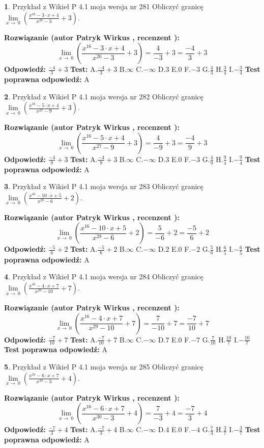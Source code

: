 \documentclass[12pt, a4paper]{article}
\theoremstyle{definition} %
\newtheorem{zad}{}
\newcommand{\zadStart}[1]{\begin{zad}#1\newline}
\newcommand{\zadStop}{\end{zad}}
\newcommand{\rozwStart}[2]{\noindent \textbf{Rozwiązanie (autor #1 , recenzent #2): }\newline}
\newcommand{\rozwStop}{\newline}
\newcommand{\odpStart}{\noindent \textbf{Odpowiedź:}\newline}
\newcommand{\odpStop}{\newline}
\newcommand{\testStart}{\noindent \textbf{Test:}\newline}
\newcommand{\testStop}{\newline}
\newcommand{\kluczStart}{\noindent \textbf{Test poprawna odpowiedź:}\newline}
\newcommand{\kluczStop}{\newline}
\begin{document}
\zadStart{Przykład z Wikieł P 4.1 moja wersja nr 281}
Obliczyć granicę $\lim\limits_{x\to\ 0}(\frac{x^{16}-3 \cdot x +4}{x^{26}-3}+3)$.
\zadStop
\rozwStart{Patryk Wirkus}{}
$$\lim\limits_{x\to\ 0}(\frac{x^{16}-3 \cdot x +4}{x^{26}-3}+3)=\frac{4}{-3}+3=\frac{-4}{3}+3$$
\rozwStop
\odpStart
$\frac{-4}{3}+3$
\odpStop
\testStart
A.$\frac{-4}{3}+3$
B.$\infty$
C.$-\infty$
D.$3$
E.$0$
F.$-3$
G.$\frac{4}{3}$
H.$\frac{3}{4}$
I.$-\frac{3}{4}$
\testStop
\kluczStart
A
\kluczStop



\zadStart{Przykład z Wikieł P 4.1 moja wersja nr 282}
Obliczyć granicę $\lim\limits_{x\to\ 0}(\frac{x^{16}-5 \cdot x +4}{x^{27}-9}+3)$.
\zadStop
\rozwStart{Patryk Wirkus}{}
$$\lim\limits_{x\to\ 0}(\frac{x^{16}-5 \cdot x +4}{x^{27}-9}+3)=\frac{4}{-9}+3=\frac{-4}{9}+3$$
\rozwStop
\odpStart
$\frac{-4}{9}+3$
\odpStop
\testStart
A.$\frac{-4}{9}+3$
B.$\infty$
C.$-\infty$
D.$3$
E.$0$
F.$-3$
G.$\frac{4}{9}$
H.$\frac{9}{4}$
I.$-\frac{9}{4}$
\testStop
\kluczStart
A
\kluczStop



\zadStart{Przykład z Wikieł P 4.1 moja wersja nr 283}
Obliczyć granicę $\lim\limits_{x\to\ 0}(\frac{x^{16}-10 \cdot x +5}{x^{28}-6}+2)$.
\zadStop
\rozwStart{Patryk Wirkus}{}
$$\lim\limits_{x\to\ 0}(\frac{x^{16}-10 \cdot x +5}{x^{28}-6}+2)=\frac{5}{-6}+2=\frac{-5}{6}+2$$
\rozwStop
\odpStart
$\frac{-5}{6}+2$
\odpStop
\testStart
A.$\frac{-5}{6}+2$
B.$\infty$
C.$-\infty$
D.$2$
E.$0$
F.$-2$
G.$\frac{5}{6}$
H.$\frac{6}{5}$
I.$-\frac{6}{5}$
\testStop
\kluczStart
A
\kluczStop



\zadStart{Przykład z Wikieł P 4.1 moja wersja nr 284}
Obliczyć granicę $\lim\limits_{x\to\ 0}(\frac{x^{16}-4 \cdot x +7}{x^{29}-10}+7)$.
\zadStop
\rozwStart{Patryk Wirkus}{}
$$\lim\limits_{x\to\ 0}(\frac{x^{16}-4 \cdot x +7}{x^{29}-10}+7)=\frac{7}{-10}+7=\frac{-7}{10}+7$$
\rozwStop
\odpStart
$\frac{-7}{10}+7$
\odpStop
\testStart
A.$\frac{-7}{10}+7$
B.$\infty$
C.$-\infty$
D.$7$
E.$0$
F.$-7$
G.$\frac{7}{10}$
H.$\frac{10}{7}$
I.$-\frac{10}{7}$
\testStop
\kluczStart
A
\kluczStop



\zadStart{Przykład z Wikieł P 4.1 moja wersja nr 285}
Obliczyć granicę $\lim\limits_{x\to\ 0}(\frac{x^{16}-6 \cdot x +7}{x^{30}-3}+4)$.
\zadStop
\rozwStart{Patryk Wirkus}{}
$$\lim\limits_{x\to\ 0}(\frac{x^{16}-6 \cdot x +7}{x^{30}-3}+4)=\frac{7}{-3}+4=\frac{-7}{3}+4$$
\rozwStop
\odpStart
$\frac{-7}{3}+4$
\odpStop
\testStart
A.$\frac{-7}{3}+4$
B.$\infty$
C.$-\infty$
D.$4$
E.$0$
F.$-4$
G.$\frac{7}{3}$
H.$\frac{3}{7}$
I.$-\frac{3}{7}$
\testStop
\kluczStart
A
\kluczStop
\end{document}
